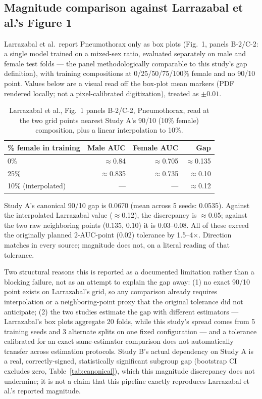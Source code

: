 \documentclass[11pt]{article}
\begin{document}
\subsection{Magnitude comparison against Larrazabal et al.'s Figure 1}
\label{sec:magnitude}

Larrazabal et al.\ report Pneumothorax only as box plots (Fig.\ 1, panels B-2/C-2: a single model trained on a mixed-sex ratio, evaluated separately on male and female test folds — the panel methodologically comparable to this study's gap definition), with training compositions at 0/25/50/75/100\% female and no 90/10 point. Values below are a visual read off the box-plot mean markers (PDF rendered locally; not a pixel-calibrated digitization), treated as $\pm0.01$.

\begin{table}[H]
\centering
\begin{tabular}{lrrr}
\toprule
\% female in training & Male AUC & Female AUC & Gap \\
\midrule
0\% & $\approx$0.84 & $\approx$0.705 & $\approx$0.135 \\
25\% & $\approx$0.835 & $\approx$0.735 & $\approx$0.10 \\
10\% (interpolated) & --- & --- & $\approx$0.12 \\
\bottomrule
\end{tabular}
\caption{Larrazabal et al., Fig.\ 1 panels B-2/C-2, Pneumothorax, read at the two grid points nearest Study A's 90/10 (10\% female) composition, plus a linear interpolation to 10\%.}
\label{tab:larrazabal}
\end{table}

Study A's canonical 90/10 gap is 0.0670 (mean across 5 seeds: 0.0535). Against the interpolated Larrazabal value ($\approx$0.12), the discrepancy is $\approx$0.05; against the two raw neighboring points (0.135, 0.10) it is 0.03--0.08. All of these exceed the originally planned 2-AUC-point (0.02) tolerance by 1.5--4$\times$. Direction matches in every source; magnitude does not, on a literal reading of that tolerance.

Two structural reasons this is reported as a documented limitation rather than a blocking failure, not as an attempt to explain the gap away: (1) no exact 90/10 point exists on Larrazabal's grid, so any comparison already requires interpolation or a neighboring-point proxy that the original tolerance did not anticipate; (2) the two studies estimate the gap with different estimators — Larrazabal's box plots aggregate 20 folds, while this study's spread comes from 5 training seeds and 3 alternate splits on one fixed configuration — and a tolerance calibrated for an exact same-estimator comparison does not automatically transfer across estimation protocols. Study B's actual dependency on Study A is a real, correctly-signed, statistically significant subgroup gap (bootstrap CI excludes zero, Table~\ref{tab:canonical}), which this magnitude discrepancy does not undermine; it is not a claim that this pipeline exactly reproduces Larrazabal et al.'s reported magnitude.
\end{document}
